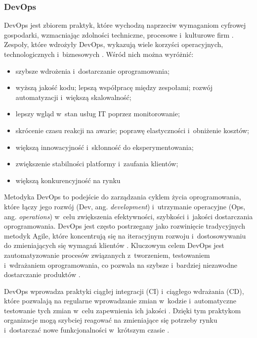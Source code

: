 \subsubsection{DevOps}
DevOps jest zbiorem praktyk, które wychodzą naprzeciw wymaganiom cyfrowej gospodarki, wzmacniając zdolności techniczne, procesowe i~kulturowe firm \cite{DoraCapabilities,Amaro2023DevOpsCapabilities}. Zespoły, które wdrożyły DevOps, wykazują wiele korzyści operacyjnych, technologicznych i~biznesowych \cite{Atlassian2020DevOpsTrends,Offerman2022DevOpsAdoption,GoogleROIDevOps,Google2022StateOfDevOps,Alawneh2022DevOpsPrinciples}.
Wśród nich można wyróżnić:
\begin{itemize}
    \item szybsze wdrożenia i~dostarczanie oprogramowania;
    \item wyższą jakość kodu; lepszą współpracę między zespołami; rozwój automatyzacji i~większą skalowalność;
    \item lepszy wgląd w~stan usług IT poprzez monitorowanie;
    \item skrócenie czasu reakcji na awarie; poprawę elastyczności i~obniżenie kosztów;
    \item większą innowacyjność i~skłonność do eksperymentowania;
    \item zwiększenie stabilności platformy i~zaufania klientów;
    \item większą konkurencyjność na rynku
\end{itemize}

Metodyka DevOps to podejście do zarządzania cyklem życia oprogramowania, które łączy jego rozwój (Dev, ang. \textit{development}) i~utrzymanie operacyjne (Ops, ang. \textit{operations}) w~celu zwiększenia efektywności, szybkości i~jakości dostarczania oprogramowania. DevOps jest często postrzegany jako rozwinięcie tradycyjnych metodyk Agile, które koncentrują się na iteracyjnym rozwoju i~dostosowywaniu do zmieniających się wymagań klientów \cite{Jayakody2023DevOpsSuccessFactors}. Kluczowym celem DevOps jest zautomatyzowanie procesów związanych z~tworzeniem, testowaniem i~wdrażaniem oprogramowania, co pozwala na szybsze i~bardziej niezawodne dostarczanie produktów \cite{Jamal2022DevOpsBenefits}.


DevOps wprowadza praktyki ciągłej integracji (CI) i~ciągłego wdrażania (CD), które pozwalają na regularne wprowadzanie zmian w~kodzie i~automatyczne testowanie tych zmian w~celu zapewnienia ich jakości \cite{Vassallo2016ContinuousDelivery}. Dzięki tym praktykom organizacje mogą szybciej reagować na zmieniające się potrzeby rynku i~dostarczać nowe funkcjonalności w~krótszym czasie \cite{Jamal2022DevOpsBenefits}.

